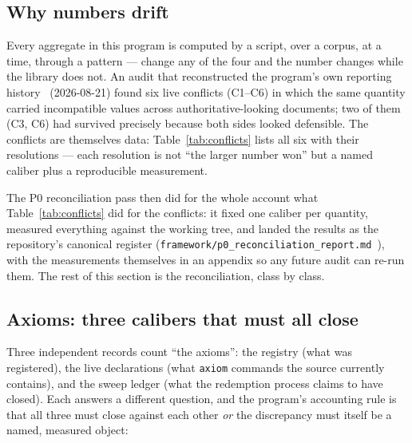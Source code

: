 
\subsection{Why numbers drift}
\label{sec:drift}
Every aggregate in this program is computed by a script, over a
corpus, at a time, through a pattern --- change any of the four and
the number changes while the library does not. An audit that
reconstructed the program's own reporting history~\cite{sylvad1review2026}
(2026-08-21) found six live conflicts (C1--C6) in which the same quantity carried
incompatible values across authoritative-looking documents; two of
them (C3, C6) had survived precisely because both sides looked
defensible. The conflicts are themselves data:
Table~\ref{tab:conflicts} lists all six with their resolutions ---
each resolution is not ``the larger number won'' but a named caliber
plus a reproducible measurement.

The P0 reconciliation pass then did for the whole account what
Table~\ref{tab:conflicts} did for the conflicts: it fixed one
caliber per quantity, measured everything against the working tree,
and landed the results as the repository's canonical register
(\texttt{framework/p0\_reconciliation\_report.md}~\cite{sylvap0recon2026}), with the
measurements themselves in an appendix so any future audit can
re-run them. The rest of this section is the reconciliation, class
by class.

\subsection{Axioms: three calibers that must all close}
\label{sec:axiom-calibers}\label{sec:conflicts}
Three independent records count ``the axioms'': the registry (what
was registered), the live declarations (what \texttt{axiom} commands
the source currently contains), and the sweep ledger (what the
redemption process claims to have closed). Each answers a different
question, and the program's accounting rule is that all three must
close against each other \emph{or} the discrepancy must itself be a
named, measured object:

